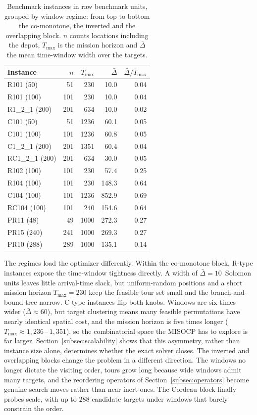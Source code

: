 \begin{table}[H]
\centering
\caption{Benchmark instances in raw benchmark units, grouped by window regime: from top to bottom the co-monotone, the inverted and the overlapping block. $n$ counts locations including the depot, $T_{\max}$ is the mission horizon and $\bar{\Delta}$ the mean time-window width over the targets.}
\label{tab:datasets}
\begin{tabular}{lrrrr}
\toprule
Instance & $n$ & $T_{\max}$ & $\bar{\Delta}$ & $\bar{\Delta}/T_{\max}$ \\
\midrule
R101 (50)       &  51 &  230 &  10.0 & 0.04 \\
R101 (100)      & 101 &  230 &  10.0 & 0.04 \\
R1\_2\_1 (200)  & 201 &  634 &  10.0 & 0.02 \\
C101 (50)       &  51 & 1236 &  60.1 & 0.05 \\
C101 (100)      & 101 & 1236 &  60.8 & 0.05 \\
C1\_2\_1 (200)  & 201 & 1351 &  60.4 & 0.04 \\
RC1\_2\_1 (200) & 201 &  634 &  30.0 & 0.05 \\
\midrule
R102 (100)      & 101 &  230 &  57.4 & 0.25 \\
R104 (100)      & 101 &  230 & 148.3 & 0.64 \\
C104 (100)      & 101 & 1236 & 852.9 & 0.69 \\
RC104 (100)     & 101 &  240 & 154.6 & 0.64 \\
\midrule
PR11 (48)       &  49 & 1000 & 272.3 & 0.27 \\
PR15 (240)      & 241 & 1000 & 269.3 & 0.27 \\
PR10 (288)      & 289 & 1000 & 135.1 & 0.14 \\
\bottomrule
\end{tabular}
\end{table}

The regimes load the optimizer differently. Within the co-monotone block, R-type instances expose the time-window tightness directly. A width of $\bar\Delta = 10$~Solomon units leaves little arrival-time slack, but uniform-random positions and a short mission horizon $T_{\max} = 230$ keep the feasible tour set small and the branch-and-bound tree narrow. C-type instances flip both knobs. Windows are six times wider ($\bar\Delta \approx 60$), but target clustering means many feasible permutations have nearly identical spatial cost, and the mission horizon is five times longer ($T_{\max} \approx 1{,}236$\,--\,$1{,}351$), so the combinatorial space the MISOCP has to explore is far larger. Section~\ref{subsec:scalability} shows that this asymmetry, rather than instance size alone, determines whether the exact solver closes. The inverted and overlapping blocks change the problem in a different direction. The windows no longer dictate the visiting order, tours grow long because wide windows admit many targets, and the reordering operators of Section~\ref{subsec:operators} become genuine search moves rather than near-inert ones. The Cordeau block finally probes scale, with up to $288$ candidate targets under windows that barely constrain the order.

